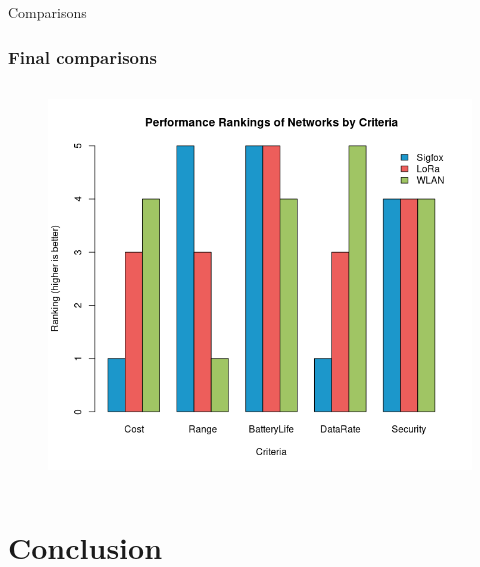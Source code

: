 \documentclass{beamer}
\begin{document}
\begin{frame}{Comparisons}
  \frametitle{Final comparisons}
  \begin{columns}
    \begin{column}{\textheight}
      \begin{figure}[htbp]
        \centering
        \includegraphics[width=\textwidth]{Network_Comparison_barplot.png}
        \label{fig:Network_comparison_barplot}
      \end{figure}
    \end{column}
  \end{columns}
\end{frame}

\section{Conclusion}
\end{document}
